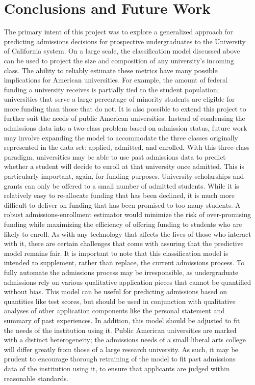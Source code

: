 \documentclass{article}
\begin{document}
\section{Conclusions and Future Work}
The primary intent of this project was to explore a generalized approach for predicting admissions decisions for prospective undergraduates to the University of California system. On a large scale, the classification model discussed above can be used to project the size and composition of any university's incoming class.
The ability to reliably estimate these metrics have many possible implications for American universities.
For example, the amount of federal funding a university receives is partially tied to the student population; universities that serve a large percentage of minority students are eligible for more funding than those that do not. \newline \indent
It is also possible to extend this project to further suit the needs of public American universities. Instead of condensing the admissions data into a two-class problem based on admission status, future work may involve expanding the model to accommodate the three classes originally represented in the data set: applied, admitted, and enrolled. With this three-class paradigm, universities may be able to use past admissions data to predict whether a student will decide to enroll at that university once admitted. This is particularly important, again, for funding purposes. University scholarships and grants can only be offered to a small number of admitted students. While it is relatively easy to re-allocate funding that has been declined, it is much more difficult to deliver on funding that has been promised to too many students. A robust admissions-enrollment estimator would minimize the risk of over-promising funding while maximizing the efficiency of offering funding to students who are likely to enroll. \newline \indent
As with any technology that affects the lives of those who interact with it, there are certain challenges that come with assuring that the predictive model remains fair. It is important to note that this classification model is intended to supplement, rather than replace, the current admissions process. To fully automate the admissions process may be irresponsible, as undergraduate admissions rely on various qualitative application pieces that cannot be quantified without bias. This model can be useful for predicting admissions based on quantities like test scores, but should be used in conjunction with qualitative analyses of other application components like the personal statement and summary of past experiences. In addition, this model should be adjusted to fit the needs of the institution using it. Public American universities are marked with a distinct heterogeneity; the admissions needs of a small liberal arts college will differ greatly from those of a large research university. As such, it may be prudent to encourage thorough retraining of the model to fit past admissions data of the institution using it, to ensure that applicants are judged within reasonable standards.
\end{document}
